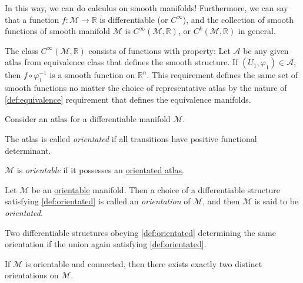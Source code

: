 In this way, we can do calculus on smooth manifolds! Furthermore, we can say that a function \(f\colon \mathcal{M} \to \mathbb{R} \) is differentiable (or \(C^{\infty} \)), and the collection of smooth functions of smooth manifold \(\mathcal{M} \) is \(C^{\infty} (\mathcal{M} , \mathbb{R} )\), or \(C^k(\mathcal{M} , \mathbb{R} )\) in general.

\begin{remark}
	The class \(C^{\infty} (\mathcal{M} , \mathbb{R} )\) consists of functions with property: Let \(\mathcal{A} \) be any given atlas from equivalence class that defines the smooth structure. If \((U_1, \varphi _1)\in \mathcal{A} \), then \(f \circ \varphi _1 ^{-1} \) is a smooth function on \(\mathbb{R} ^n\). This requirement defines the same set of smooth functions no matter the choice of representative atlas by the nature of \autoref{def:equivalence} requirement that defines the equivalence manifolds.
\end{remark}

\begin{definition}[Orientation]\label{def:orientation}
	Consider an atlas for a differentiable manifold \(\mathcal{M} \).
	\begin{definition}[Orientated]\label{def:orientated}
		The atlas is called \emph{orientated} if all transitions have positive functional determinant.
	\end{definition}

	\begin{definition}[Orientable]\label{def:orientable}
		\(\mathcal{M} \) is \emph{orientable} if it possesses an \hyperref[def:orientated]{orientated atlas}.
	\end{definition}

	\begin{definition}
		Let \(\mathcal{M} \) be an \hyperref[def:orientable]{orientable} manifold. Then a choice of a differentiable structure satisfying \autoref{def:orientated} is called an \emph{orientation} of \(\mathcal{M} \), and then \(\mathcal{M} \) is said to be \emph{orientated}.
	\end{definition}
\end{definition}

\begin{remark}
	Two differentiable structures obeying \autoref{def:orientated} determining the same orientation if the union again satisfying \autoref{def:orientated}.
\end{remark}

\begin{remark}
	If \(\mathcal{M} \) is orientable and connected, then there exists exactly two distinct orientations on \(\mathcal{M} \).
\end{remark}


